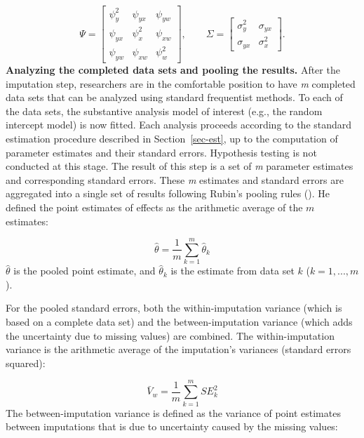 \documentclass[
  letterpaper,
  11pt,
  english,
  singlespacing,
  headsepline,
  openany]{MastersDoctoralThesis}
\begin{document}
\[
\Psi =
\left[
\begin{matrix}
\psi_y^2 & \psi_{yx} & \psi_{yw} \\
\psi_{yx} & \psi_x^2 & \psi_{xw} \\
\psi_{yw} & \psi_{xw} & \psi_w^2
\end{matrix}
\right],
\qquad
\Sigma =
\left[
\begin{matrix}
\sigma_y^2 & \sigma_{yx} \\
\sigma_{yx} & \sigma_x^2
\end{matrix}
\right].
\] \textbf{Analyzing the completed data sets and pooling the results.}
After the imputation step, researchers are in the comfortable position
to have \emph{m} completed data sets that can be analyzed using standard
frequentist methods. To each of the data sets, the substantive analysis
model of interest (e.g., the random intercept model) is now fitted. Each
analysis proceeds according to the standard estimation procedure
described in Section~\ref{sec-est}, up to the computation of parameter
estimates and their standard errors. Hypothesis testing is not conducted
at this stage. The result of this step is a set of \emph{m} parameter
estimates and corresponding standard errors. These \emph{m} estimates
and standard errors are aggregated into a single set of results
following Rubin's pooling rules (). He defined the point estimates of effects as the arithmetic
average of the \(m\) estimates:

\[
\hat{\theta} = \frac{1}{m}
\sum_{k=1}^{m}
\hat{\theta}_k
\] \(\hat{\theta}\) is the pooled point estimate, and \(\hat{\theta}_k\)
is the estimate from data set \(k\) (\(k=1, ...,m\)).

For the pooled standard errors, both the within-imputation variance
(which is based on a complete data set) and the between-imputation
variance (which adds the uncertainty due to missing values) are
combined. The within-imputation variance is the arithmetic average of
the imputation's variances (standard errors squared):

\[
\bar{V}_w
=
\frac{1}{m}
\sum_{k=1}^{m}
SE^2_k
\] The between-imputation variance is defined as the variance of point
estimates between imputations that is due to uncertainty caused by the
missing values:
\end{document}

